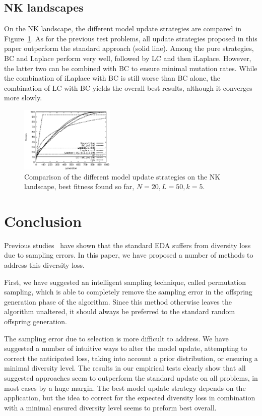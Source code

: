 \documentclass{acm_proc_article-sp}
\newcommand{\Np}{N}
\begin{document}
\subsection{NK landscapes}
\label{sec:nk}

On the NK landscape, the different model update strategies are
compared in Figure~\ref{fig:nk}.  As for the previous test problems, all update
strategies proposed in this paper outperform the standard approach
(solid line). Among the pure strategies, BC and Laplace perform very
well, followed by LC and then iLaplace. However, the latter two can be
combined with BC to ensure minimal mutation rates. While the
combination of iLaplace with BC is still worse than BC alone, the
combination of LC with BC yields the overall best results, although it
converges more slowly.
\begin{figure}
\centerline{
\includegraphics[width=0.4\textwidth]{graph_leading1169910391/graph_leading000_fitness.eps}}
\caption{Comparison of the different model update strategies on the NK landscape, best fitness found so far, $\Np=20, L=50, k=5$.\label{fig:nk}}
\end{figure}


\section{Conclusion}

Previous studies~\cite{Gonzalez2002,Shapiro2003a,Shapiro2006} have shown that the standard EDA
suffers from diversity loss due to sampling errors. In this paper, we have proposed a number
of methods to address this diversity loss. 

First, we have suggested an intelligent sampling technique, called permutation sampling, which is able to completely remove
the sampling error in the offspring generation phase of the algorithm. Since this method
otherwise leaves the algorithm unaltered, it should always be preferred to the standard
random offspring generation. 

The sampling error due to selection is more difficult to address. We have suggested a
number of intuitive ways to alter the model update, attempting to correct the
anticipated loss, taking into account a prior distribution, or ensuring a minimal
diversity level. The results in our empirical tests clearly show that all suggested
approaches seem to outperform the standard update on all problems, 
in most cases by a huge margin. 
The best model update strategy depends on the application, 
but the idea to correct for the expected diversity loss in combination with a minimal
ensured diversity level seems to preform best overall.
\end{document}
